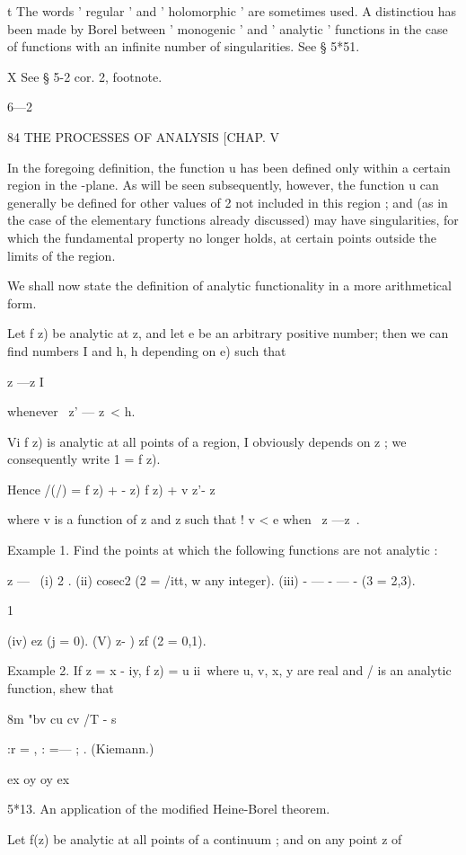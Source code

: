 t The words ' regular ' and ' holomorphic ' are sometimes used. A distinctiou has been made 
by Borel between ' monogenic ' and ' analytic ' functions in the case of functions with an infinite 
number of singularities. See § 5*51. 

X See § 5-2 cor. 2, footnote. 

6—2 



84 THE PROCESSES OF ANALYSIS [CHAP. V 

In the foregoing definition, the function u has been defined only within 
a certain region in the  -plane. As will be seen subsequently, however, the 
function u can generally be defined for other values of 2 not included in this 
region ; and (as in the case of the elementary functions already discussed) 
may have singularities, for which the fundamental property no longer holds, 
at certain points outside the limits of the region. 

We shall now state the definition of analytic functionality in a more 
arithmetical form. 

Let f z) be analytic at z, and let e be an arbitrary positive number; 
then we can find numbers I and h,  h depending on e) such that 

z —z I 

whenever \ z' — z\ < h. 

Vi f z) is analytic at all points   of a region, I obviously depends on z ; we 
consequently write 1 = f  z). 

Hence /(/) = f z) +  - z) f  z) + v z'- z\ 

where v is a function of z and z such that ! v < e when \ z —z\ < t>. 

Example 1. Find the points at which the following functions are not analytic : 

z — \ 
(i) 2 . (ii) cosec2 (2 = /itt, w any integer). (iii) -  — - — - (3 = 2,3). 

1 

(iv) ez (j = 0). (V)   z- ) zf (2 = 0,1). 

Example 2. If z = x -  iy, f  z) = u   ii\ where u, v, x, y are real and / is an analytic 
function, shew that 

8m "bv cu cv /T - s 

 :r =   , : =— ; . (Kiemann.) 

ex oy oy ex 

5*13. An application of the modified Heine-Borel theorem. 

Let f(z) be analytic at all points of a continuum ; and on any point z of 

